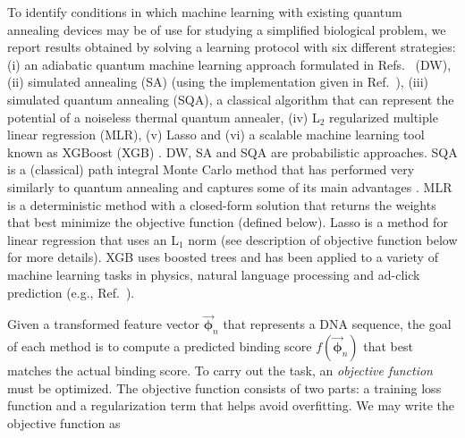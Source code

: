 \documentclass[aps,pra,groupedaddress,nofootinbib,notitlepage,showpacs,floatfix,superscriptaddress]{revtex4-1}
\begin{document}
To identify conditions in which machine learning with existing quantum annealing devices may be of use for studying a simplified biological problem, we report results obtained by solving a learning protocol with six different strategies: (i) an adiabatic quantum machine learning approach formulated in Refs.~\cite{Neven1,Pudenz:2013kx} (DW), (ii) simulated annealing \cite{kirkpatrick_optimization_1983} (SA) (using the implementation given in Ref.~\cite{Isakov-SA:14}), (iii) simulated quantum annealing \cite{Santoro} (SQA), a classical algorithm that can represent the potential of a noiseless thermal quantum annealer, (iv) L$_2$ regularized multiple linear regression (MLR), (v) Lasso \cite{Tibshirani:96} and (vi) a scalable machine learning tool known as XGBoost (XGB) \cite{Chen:16}. DW, SA and SQA are probabilistic approaches. SQA is a (classical) path integral Monte Carlo method that has performed very similarly to quantum annealing and captures some of its main advantages \cite{Crosson-Harrow:2016}. MLR is a deterministic method with a closed-form solution that returns the weights that best minimize the objective function (defined below). Lasso is a method for linear regression that uses an L$_1$ norm (see description of objective function below for more details). XGB uses boosted trees and has been applied to a variety of machine learning tasks in physics, natural language processing and ad-click prediction (e.g., Ref.~\cite{chen2015higgs}).

Given a transformed feature vector $\vec{\bm{\phi}}_n$ that represents a DNA sequence, the goal of each method is to compute a predicted binding score $f(\vec{\bm{\phi}}_n)$ that best matches the actual binding score. To carry out the task, an \textit{objective function} must be optimized. The objective function consists of two parts: a training loss function and a regularization term that helps avoid overfitting. We may write the objective function as
\end{document}
